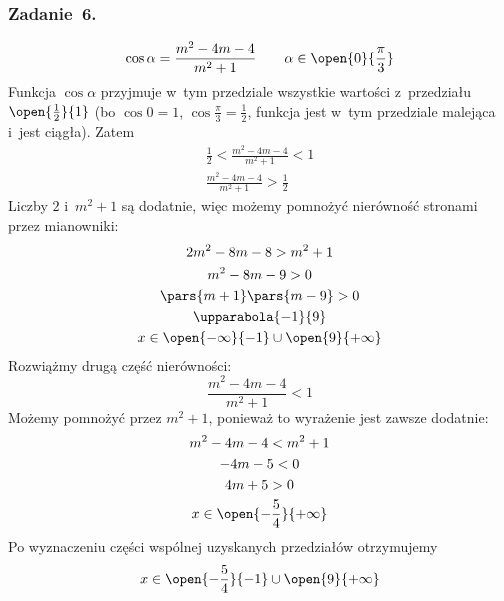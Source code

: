 \subsubsection*{Zadanie~6.}
\begin{equation*}
    \cos\alpha = \frac{m^2 - 4m - 4}{m^2 + 1} \qquad \alpha \in \open{0}{\frac{\pi}{3}}
\end{equation*}
Funkcja \(\cos\alpha\) przyjmuje w~tym przedziale wszystkie wartości z~przedziału \(\open{\frac{1}{2}}{1}\) (bo \(\cos0 = 1\), \(\cos\frac{\pi}{3} = \frac{1}{2}\), funkcja jest w~tym przedziale malejąca i~jest ciągła). Zatem
\begin{gather*}
    \frac{1}{2} < \frac{m^2 - 4m - 4}{m^2 + 1} < 1\\
    \frac{m^2 - 4m - 4}{m^2 + 1} > \frac{1}{2}
\end{gather*}
Liczby \(2\) i~\(m^2 + 1\) są dodatnie, więc możemy pomnożyć nierówność stronami przez mianowniki:
\begin{gather*}
    2m^2 - 8m - 8 > m^2 + 1\\
    m^2 - 8m - 9 > 0\\
    \pars{m + 1}\pars{m - 9} > 0\\
    \upparabola{-1}{9}\\
    x \in \open{-\infty}{-1} \cup \open{9}{+\infty}
\end{gather*}
Rozwiążmy drugą część nierówności:
\begin{equation*}
    \frac{m^2 - 4m - 4}{m^2 + 1} < 1
\end{equation*}
Możemy pomnożyć przez \(m^2 + 1\), ponieważ to wyrażenie jest zawsze dodatnie:
\begin{gather*}
    m^2 - 4m - 4 < m^2 + 1\\
    -4m - 5 < 0\\
    4m + 5 > 0\\
    x \in \open{-\frac{5}{4}}{+\infty}
\end{gather*}
Po wyznaczeniu części wspólnej uzyskanych przedziałów otrzymujemy
\begin{equation*}
    x \in \open{-\frac{5}{4}}{-1} \cup \open{9}{+\infty}
\end{equation*}
